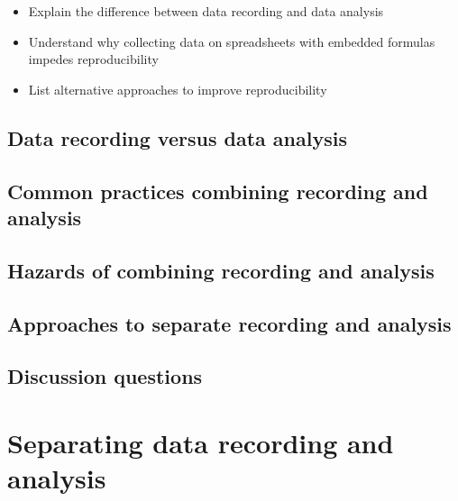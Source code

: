 \documentclass[]{tufte-book}
\providecommand{\tightlist}{%
  \setlength{\itemsep}{0pt}\setlength{\parskip}{0pt}}
\begin{document}
\begin{itemize}
\tightlist
\item
  Explain the difference between data recording and data analysis
\item
  Understand why collecting data on spreadsheets with embedded formulas impedes
  reproducibility
\item
  List alternative approaches to improve reproducibility
\end{itemize}

\hypertarget{data-recording-versus-data-analysis-3}{%
\subsection{Data recording versus data analysis}\label{data-recording-versus-data-analysis-3}}

\hypertarget{common-practices-combining-recording-and-analysis-3}{%
\subsection{Common practices combining recording and analysis}\label{common-practices-combining-recording-and-analysis-3}}

\hypertarget{hazards-of-combining-recording-and-analysis-3}{%
\subsection{Hazards of combining recording and analysis}\label{hazards-of-combining-recording-and-analysis-3}}

\hypertarget{approaches-to-separate-recording-and-analysis-3}{%
\subsection{Approaches to separate recording and analysis}\label{approaches-to-separate-recording-and-analysis-3}}

\hypertarget{discussion-questions-3}{%
\subsection{Discussion questions}\label{discussion-questions-3}}

\hypertarget{separating-data-recording-and-analysis-4}{%
\section{Separating data recording and analysis}\label{separating-data-recording-and-analysis-4}}
\end{document}

